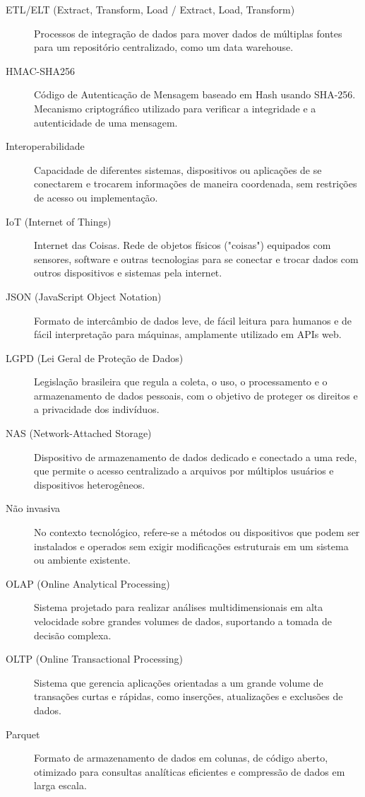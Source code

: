 \begin{description}
    \item[ETL/ELT (Extract, Transform, Load / Extract, Load, Transform)] Processos de integração de dados para mover dados de múltiplas fontes para um repositório centralizado, como um data warehouse.
    \item[HMAC-SHA256] Código de Autenticação de Mensagem baseado em Hash usando SHA-256. Mecanismo criptográfico utilizado para verificar a integridade e a autenticidade de uma mensagem.
    \item[Interoperabilidade] Capacidade de diferentes sistemas, dispositivos ou aplicações de se conectarem e trocarem informações de maneira coordenada, sem restrições de acesso ou implementação.
    \item[IoT (Internet of Things)] Internet das Coisas. Rede de objetos físicos ("coisas") equipados com sensores, software e outras tecnologias para se conectar e trocar dados com outros dispositivos e sistemas pela internet.
    \item[JSON (JavaScript Object Notation)] Formato de intercâmbio de dados leve, de fácil leitura para humanos e de fácil interpretação para máquinas, amplamente utilizado em APIs web.
    \item[LGPD (Lei Geral de Proteção de Dados)] Legislação brasileira que regula a coleta, o uso, o processamento e o armazenamento de dados pessoais, com o objetivo de proteger os direitos e a privacidade dos indivíduos.
    \item[NAS (Network-Attached Storage)] Dispositivo de armazenamento de dados dedicado e conectado a uma rede, que permite o acesso centralizado a arquivos por múltiplos usuários e dispositivos heterogêneos.
    \item[Não invasiva] No contexto tecnológico, refere-se a métodos ou dispositivos que podem ser instalados e operados sem exigir modificações estruturais em um sistema ou ambiente existente.
    \item[OLAP (Online Analytical Processing)] Sistema projetado para realizar análises multidimensionais em alta velocidade sobre grandes volumes de dados, suportando a tomada de decisão complexa.
    \item[OLTP (Online Transactional Processing)] Sistema que gerencia aplicações orientadas a um grande volume de transações curtas e rápidas, como inserções, atualizações e exclusões de dados.
    \item[Parquet] Formato de armazenamento de dados em colunas, de código aberto, otimizado para consultas analíticas eficientes e compressão de dados em larga escala.

\end{description}
